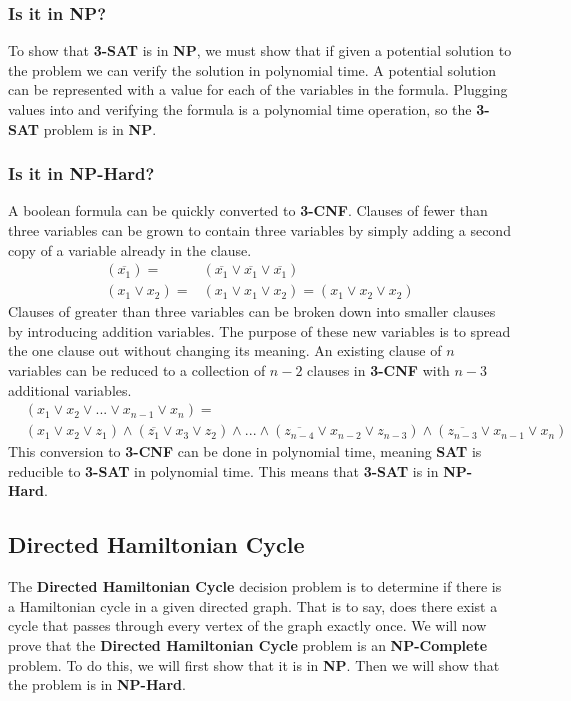     \subsubsection{Is it in NP?}
        To show that \textbf{3-SAT} is in \textbf{NP}, we must show that if given a potential solution to the problem we can verify the solution in polynomial time. A potential solution can be represented with a value for each of the variables in the formula. Plugging values into and verifying the formula is a polynomial time operation, so the \textbf{3-SAT} problem is in \textbf{NP}.
    \subsubsection{Is it in NP-Hard?}
        A boolean formula can be quickly converted to \textbf{3-CNF}. Clauses of fewer than three variables can be grown to contain three variables by simply adding a second copy of a variable already in the clause.
        \begin{align*}
            (\overline{x_1}) = &(\overline{x_1} \lor \overline{x_1} \lor \overline{x_1}) \\
            (x_1 \lor x_2) = &(x_1 \lor x_1 \lor x_2) = (x_1 \lor x_2 \lor x_2)
        \end{align*}
        Clauses of greater than three variables can be broken down into smaller clauses by introducing addition variables. The purpose of these new variables is to spread the one clause out without changing its meaning. An existing clause of $n$ variables can be reduced to a collection of $n-2$ clauses in \textbf{3-CNF} with $n-3$ additional variables.
        \begin{align*}
            &(x_1 \lor x_2 \lor ... \lor x_{n-1} \lor x_{n}) = \\ &(x_1 \lor x_2 \lor z_1) \land (\overline{z_1} \lor x_3 \lor z_2) \land ... \land (\overline{z_{n-4}} \lor x_{n-2} \lor z_{n-3}) \land (\overline{z_{n-3}} \lor x_{n-1} \lor x_{n})
        \end{align*}
        This conversion to \textbf{3-CNF} can be done in polynomial time, meaning \textbf{SAT} is reducible to \textbf{3-SAT} in polynomial time. This means that \textbf{3-SAT} is in \textbf{NP-Hard}.

\subsection{Directed Hamiltonian Cycle}
    The \textbf{Directed Hamiltonian Cycle} decision problem is to determine if there is a Hamiltonian cycle in a given directed graph. That is to say, does there exist a cycle that passes through every vertex of the graph exactly once. We will now prove that the \textbf{Directed Hamiltonian Cycle} problem is an \textbf{NP-Complete} problem. To do this, we will first show that it is in \textbf{NP}. Then we will show that the problem is in \textbf{NP-Hard}.

